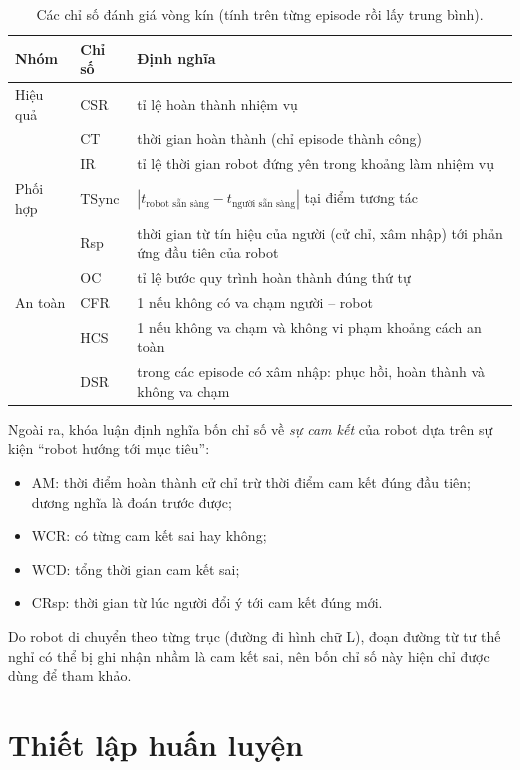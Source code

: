 \begin{table}[htbp]
  \centering
  \caption{Các chỉ số đánh giá vòng kín (tính trên từng episode rồi lấy trung bình).}
  \label{tab:metrics}
  \small
  \begin{tabularx}{\textwidth}{@{}l l X@{}}
    \toprule
    \textbf{Nhóm} & \textbf{Chỉ số} & \textbf{Định nghĩa} \\
    \midrule
    Hiệu quả & CSR & tỉ lệ hoàn thành nhiệm vụ \\
             & CT  & thời gian hoàn thành (chỉ episode thành công) \\
             & IR  & tỉ lệ thời gian robot đứng yên trong khoảng làm nhiệm vụ \\
    \addlinespace
    Phối hợp & TSync & $|t_\text{robot sẵn sàng} - t_\text{người sẵn sàng}|$ tại điểm tương tác \\
             & Rsp   & thời gian từ tín hiệu của người (cử chỉ, xâm nhập) tới phản ứng đầu tiên của robot \\
             & OC    & tỉ lệ bước quy trình hoàn thành đúng thứ tự \\
    \addlinespace
    An toàn  & CFR & 1 nếu không có va chạm người -- robot \\
             & HCS & 1 nếu không va chạm và không vi phạm khoảng cách an toàn \\
             & DSR & trong các episode có xâm nhập: phục hồi, hoàn thành và không va chạm \\
    \bottomrule
  \end{tabularx}
\end{table}

Ngoài ra, khóa luận định nghĩa bốn chỉ số về \emph{sự cam kết} của robot dựa trên sự kiện ``robot hướng tới mục tiêu'':
\begin{itemize}
  \item AM: thời điểm hoàn thành cử chỉ trừ thời điểm cam kết đúng đầu tiên; dương nghĩa là đoán trước được;
  \item WCR: có từng cam kết sai hay không;
  \item WCD: tổng thời gian cam kết sai;
  \item CRsp: thời gian từ lúc người đổi ý tới cam kết đúng mới.
\end{itemize}
Do robot di chuyển theo từng trục (đường đi hình chữ L), đoạn đường từ tư thế nghỉ có thể bị ghi nhận nhầm là cam kết sai, nên bốn chỉ số này hiện chỉ được dùng để tham khảo.

\section{Thiết lập huấn luyện}
\label{sec:training-setup}

